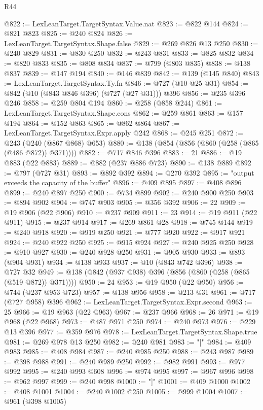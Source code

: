\begin{lexlean}{R44}
\begin{coremodule}
@822 := LexLeanTarget.TargetSyntax.Value.nat
@823 := @822 @144
@824 := @821 @823
@825 := @240 @824
@826 := LexLeanTarget.TargetSyntax.Shape.false
@829 := @269 @826 @13 @250
@830 := @240 @829
@831 := @830 @250
@832 := @243 @831
@833 := @825 @832
@834 := @820 @833
@835 := @808 @834
@837 := @799 (@803 @835)
@838 := @138 @837
@839 := @147 @194
@840 := @146 @839
@842 := @139 (@145 @840)
@843 := LexLeanTarget.TargetSyntax.Ty.fn
@846 := @727 (@10 @25 @31)
@854 := @842 (@10 (@843 @846 @396) (@727 (@27 @31))) @396
@856 := @235 @396 @246
@858 := @259 @804 @194
@860 := @258 (@858 @244)
@861 := LexLeanTarget.TargetSyntax.Shape.cons
@862 := @259 @861
@863 := @157 @194
@864 := @152 @863
@865 := @862 @864
@867 := LexLeanTarget.TargetSyntax.Expr.apply @242
@868 := @245 @251
@872 := @243 (@240 (@867 @868) @653)
@880 := @138 (@854 (@856 (@860 (@258 (@865 (@486 @872)) @371))))
@882 := @717 @846 @396
@883 := 21
@886 := @19 @883 (@22 @883)
@889 := @882 (@237 @886 @723)
@890 := @138 @889
@892 := @797 (@727 @31)
@893 := @892 @392
@894 := @270 @392
@895 := "output exceeds the capacity of the buffer"
@896 := @409 @895
@897 := @408 @896
@899 := @240 @897 @250
@900 := @734 @899
@902 := @240 @900 @250
@903 := @894 @902
@904 := @747 @903
@905 := @356 @392
@906 := 22
@909 := @19 @906 (@22 @906)
@910 := @237 @909
@911 := 23
@914 := @19 @911 (@22 @911)
@915 := @237 @914
@917 := @269 @861 @28
@918 := @745 @144
@919 := @240 @918
@920 := @919 @250
@921 := @777 @920
@922 := @917 @921
@924 := @240 @922 @250
@925 := @915 @924
@927 := @240 @925 @250
@928 := @910 @927
@930 := @240 @928 @250
@931 := @905 @930
@933 := @893 (@904 @931)
@934 := @138 @933
@937 := @10 (@843 @742 @396)
@938 := @727 @32
@949 := @138 (@842 (@937 @938) @396 (@856 (@860 (@258 (@865 (@519 @872)) @371))))
@950 := 24
@953 := @19 @950 (@22 @950)
@956 := @744 (@237 @953 @723)
@957 := @138 @956
@958 := @213 @31
@961 := @717 (@727 @958) @396
@962 := LexLeanTarget.TargetSyntax.Expr.second
@963 := 25
@966 := @19 @963 (@22 @963)
@967 := @237 @966
@968 := 26
@971 := @19 @968 (@22 @968)
@973 := @487 @971 @250
@974 := @240 @973
@976 := @229 @13 @396
@977 := @359 @976
@978 := LexLeanTarget.TargetSyntax.Shape.true
@981 := @269 @978 @13 @250
@982 := @240 @981
@983 := "["
@984 := @409 @983
@985 := @408 @984
@987 := @240 @985 @250
@988 := @243 @987
@989 := @398 @988
@991 := @240 @989 @250
@992 := @982 @991
@993 := @977 @992
@995 := @240 @993 @608
@996 := @974 @995
@997 := @967 @996
@998 := @962 @997
@999 := @240 @998
@1000 := "]"
@1001 := @409 @1000
@1002 := @408 @1001
@1004 := @240 @1002 @250
@1005 := @999 @1004
@1007 := @961 (@398 @1005)

\end{coremodule}
\end{lexlean}
